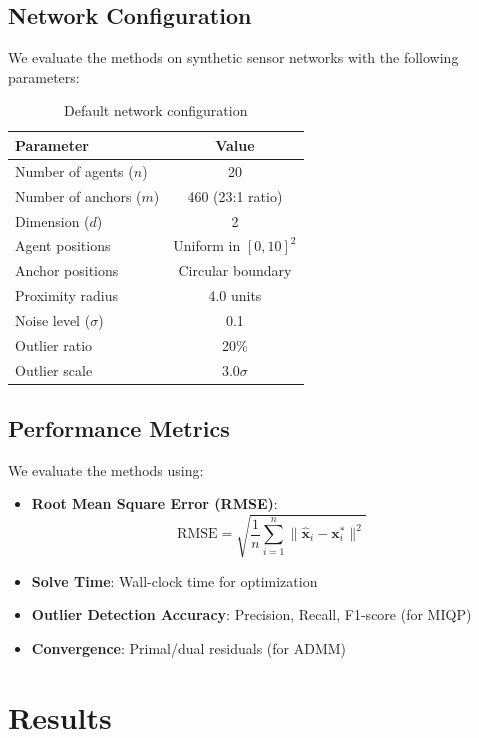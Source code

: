 \documentclass[11pt,a4paper]{article}
\begin{document}
\subsection{Network Configuration}

We evaluate the methods on synthetic sensor networks with the following parameters:

\begin{table}[h]
\centering
\begin{tabular}{@{}lc@{}}
\toprule
\textbf{Parameter} & \textbf{Value} \\
\midrule
Number of agents ($n$) & 20 \\
Number of anchors ($m$) & 460 (23:1 ratio) \\
Dimension ($d$) & 2 \\
Agent positions & Uniform in $[0, 10]^2$ \\
Anchor positions & Circular boundary \\
Proximity radius & 4.0 units \\
Noise level ($\sigma$) & 0.1 \\
Outlier ratio & 20\% \\
Outlier scale & 3.0$\sigma$ \\
\bottomrule
\end{tabular}
\caption{Default network configuration}
\label{tab:config}
\end{table}

\subsection{Performance Metrics}

We evaluate the methods using:
\begin{itemize}
    \item \textbf{Root Mean Square Error (RMSE)}:
    \begin{equation}
    \text{RMSE} = \sqrt{\frac{1}{n}\sum_{i=1}^n \|\hat{\mathbf{x}}_i - \mathbf{x}_i^*\|^2}
    \end{equation}
    \item \textbf{Solve Time}: Wall-clock time for optimization
    \item \textbf{Outlier Detection Accuracy}: Precision, Recall, F1-score (for MIQP)
    \item \textbf{Convergence}: Primal/dual residuals (for ADMM)
\end{itemize}

\section{Results}
\end{document}
